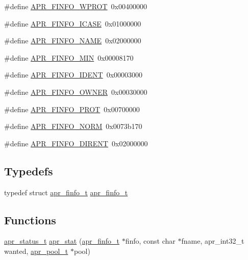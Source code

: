 \begin{DoxyCompactItemize}
\item 
\#define \hyperlink{group__apr__file__stat_gab970792384fe9a805cf66983350eefdc}{A\-P\-R\-\_\-\-F\-I\-N\-F\-O\-\_\-\-W\-P\-R\-O\-T}~0x00400000
\item 
\#define \hyperlink{group__apr__file__stat_gac46eeba0ae0e771c6ed3cb27fd5492d8}{A\-P\-R\-\_\-\-F\-I\-N\-F\-O\-\_\-\-I\-C\-A\-S\-E}~0x01000000
\item 
\#define \hyperlink{group__apr__file__stat_ga7fa4caf84808c11a1ec33c5c8d613e4b}{A\-P\-R\-\_\-\-F\-I\-N\-F\-O\-\_\-\-N\-A\-M\-E}~0x02000000
\item 
\#define \hyperlink{group__apr__file__stat_ga341104571b05550aa923cb14898a82ef}{A\-P\-R\-\_\-\-F\-I\-N\-F\-O\-\_\-\-M\-I\-N}~0x00008170
\item 
\#define \hyperlink{group__apr__file__stat_ga3ac8c8d0492291417be3d32556464108}{A\-P\-R\-\_\-\-F\-I\-N\-F\-O\-\_\-\-I\-D\-E\-N\-T}~0x00003000
\item 
\#define \hyperlink{group__apr__file__stat_ga27dee9407b38a459c57618098c3920b0}{A\-P\-R\-\_\-\-F\-I\-N\-F\-O\-\_\-\-O\-W\-N\-E\-R}~0x00030000
\item 
\#define \hyperlink{group__apr__file__stat_gad902be0636860cb3f8ad76a59abbcd7c}{A\-P\-R\-\_\-\-F\-I\-N\-F\-O\-\_\-\-P\-R\-O\-T}~0x00700000
\item 
\#define \hyperlink{group__apr__file__stat_gad3f64010d25d2fe926191804d7c99379}{A\-P\-R\-\_\-\-F\-I\-N\-F\-O\-\_\-\-N\-O\-R\-M}~0x0073b170
\item 
\#define \hyperlink{group__apr__file__stat_gaac6679307cc735f2f0373960db96b931}{A\-P\-R\-\_\-\-F\-I\-N\-F\-O\-\_\-\-D\-I\-R\-E\-N\-T}~0x02000000
\end{DoxyCompactItemize}
\subsection*{Typedefs}
\begin{DoxyCompactItemize}
\item 
typedef struct \hyperlink{structapr__finfo__t}{apr\-\_\-finfo\-\_\-t} \hyperlink{group__apr__file__stat_ga3d390fdda1d16ae462c11b2d3b18efd1}{apr\-\_\-finfo\-\_\-t}
\end{DoxyCompactItemize}
\subsection*{Functions}
\begin{DoxyCompactItemize}
\item 
\hyperlink{group__apr__errno_gaf76ee4543247e9fb3f3546203e590a6c}{apr\-\_\-status\-\_\-t} \hyperlink{group__apr__file__stat_gafb0f4a4fa4545c155e20ddd8f2001c1a}{apr\-\_\-stat} (\hyperlink{structapr__finfo__t}{apr\-\_\-finfo\-\_\-t} $\ast$finfo, const char $\ast$fname, apr\-\_\-int32\-\_\-t wanted, \hyperlink{group__apr__pools_gaf137f28edcf9a086cd6bc36c20d7cdfb}{apr\-\_\-pool\-\_\-t} $\ast$pool)
\end{DoxyCompactItemize}


